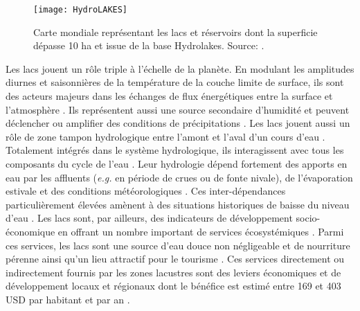 \begin{figure}[h!]
 \centering
 \texttt{[image: HydroLAKES]}
 \caption{Carte mondiale représentant les lacs et réservoirs dont la superficie dépasse 10 ha et issue de la base Hydrolakes. Source: \citet{messager2016}.}
 \label{hydrolakes}
\end{figure}

Les lacs jouent un rôle triple à l’échelle de la planète. En modulant les amplitudes diurnes et saisonnières de la température de la couche limite de surface, ils sont des acteurs majeurs dans les échanges de flux énergétiques entre la surface et l'atmosphère  \citep{long2007}. Ils représentent aussi une source secondaire d’humidité et peuvent déclencher ou amplifier des conditions de précipitations \citep{miner1997}. Les lacs jouent aussi un rôle de zone tampon hydrologique entre l’amont et l’aval d'un cours d'eau \citep{spence2006}. Totalement intégrés dans le système hydrologique, ils interagissent avec tous les composants du cycle de l'eau \citep{muller2014}. Leur hydrologie dépend fortement des apports en eau par les affluents (\textit{e.g.} en période de crues ou de fonte nivale), de l’évaporation estivale et des conditions météorologiques \citep{marsh1996, winter2004}. Ces inter-dépendances particulièrement élevées amènent à des situations historiques de baisse du niveau d'eau \citep{gronewold2016, wurtsbaugh2017}. Les lacs sont, par ailleurs, des indicateurs de développement socio-économique en offrant un nombre important de services écosystémiques \citep{sarch2000,schindler2009}. Parmi ces services, les lacs sont une source d'eau douce non négligeable et de nourriture pérenne ainsi qu'un lieu attractif pour le tourisme \citep{sterner2020}. Ces services directement ou indirectement fournis par les zones lacustres sont des leviers économiques et de développement locaux et régionaux dont le bénéfice est estimé entre 169 et 403 USD par habitant et par an \citep{reynaud2017}. \\

